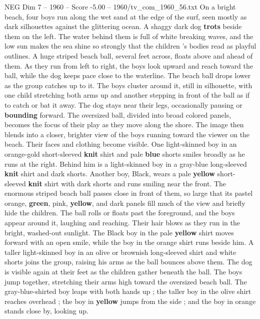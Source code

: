 \begin{textsample}{NEG Dim 7 – 1960 – Score -5.00 – 1960/tv\_com\_1960\_56.txt}  \label{ex:f7_neg_071}
On a bright beach, four boys run along the wet sand at the edge of the surf, seen mostly as dark silhouettes against the glittering ocean.
A shaggy dark dog \textbf{trots} beside them on the left.
The water behind them is full of white breaking waves, and the low sun makes the sea shine so strongly that the children ’s bodies read as playful outlines.
A huge striped beach ball, several feet across, floats above and ahead of them.
As they run from left to right, the boys look upward and reach toward the ball, while the dog keeps pace close to the waterline.
The beach ball drops lower as the group catches up to it.
The boys cluster around it, still in silhouette, with one child stretching both arms up and another stepping in front of the ball as if to catch or bat it away.
The dog stays near their legs, occasionally pausing or \textbf{bounding} forward.
The oversized ball, divided into broad colored panels, becomes the focus of their play as they move along the shore.
The image then blends into a closer, brighter view of the boys running toward the viewer on the beach.
Their faces and clothing become visible.
One light-skinned boy in an orange-gold short-sleeved \textbf{knit} shirt and pale \textbf{blue} shorts smiles broadly as he runs at the right.
Behind him is a light-skinned boy in a gray-blue long-sleeved \textbf{knit} shirt and dark shorts.
Another boy, Black, wears a pale \textbf{yellow} short-sleeved \textbf{knit} shirt with dark shorts and runs smiling near the front.
The enormous striped beach ball passes close in front of them, so large that its pastel orange, \textbf{green}, pink, \textbf{yellow}, and dark panels fill much of the view and briefly hide the children.
The ball rolls or floats past the foreground, and the boys appear around it, laughing and reaching.
Their hair blows as they run in the bright, washed-out sunlight.
The Black boy in the pale \textbf{yellow} shirt moves forward with an open smile, while the boy in the orange shirt runs beside him.
A taller light-skinned boy in an olive or brownish long-sleeved shirt and white shorts joins the group, raising his arms as the ball bounces above them.
The dog is visible again at their feet as the children gather beneath the ball.
The boys jump together, stretching their arms high toward the oversized beach ball.
The gray-blue-shirted boy leaps with both hands up ; the taller boy in the olive shirt reaches overhead ; the boy in \textbf{yellow} jumps from the side ; and the boy in orange stands close by, looking up.

\end{textsample}
